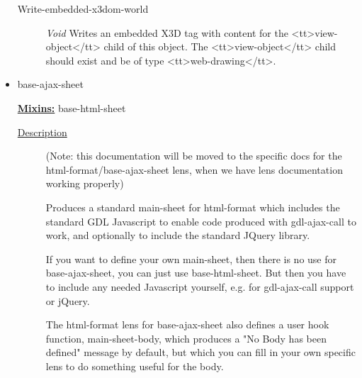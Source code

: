 \documentclass [11pt]{book}
\begin{document}
\begin{itemize}
\begin{description}

\item [Write-embedded-x3dom-world]
\emph{Void} Writes an embedded X3D tag with content for the <tt>view-object</tt> child of this object.
The <tt>view-object</tt> child should exist and be of type <tt>web-drawing</tt>.


\end{description}







\item {}base-ajax-sheet


\textbf{
\underline{Mixins:}} base-html-sheet





\begin{description}

\item [
\underline{Description}]


(Note: this documentation will be moved
to the specific docs for the html-format/base-ajax-sheet lens, when 
we have lens documentation working properly)

Produces a standard main-sheet for html-format which includes the
standard GDL Javascript to enable code produced with gdl-ajax-call to
work, and optionally to include the standard JQuery library.

If you want to define your own main-sheet, then there is no use for
base-ajax-sheet, you can just use base-html-sheet. But then you have
to include any needed Javascript yourself, e.g. for gdl-ajax-call
support or jQuery.

The html-format lens for base-ajax-sheet also defines a user hook function,
main-sheet-body, which produces a "No Body has been defined" message by default, 
but which you can fill in your own specific lens to do something useful for the body.



\end{description}




\begin{figure}
\begin{lrbox}{\boxedverb}
\begin{minipage}{\linewidth}
{\small

}
\end{minipage}
\end{lrbox}
\end{figure}
\end{itemize}
\end{document}
